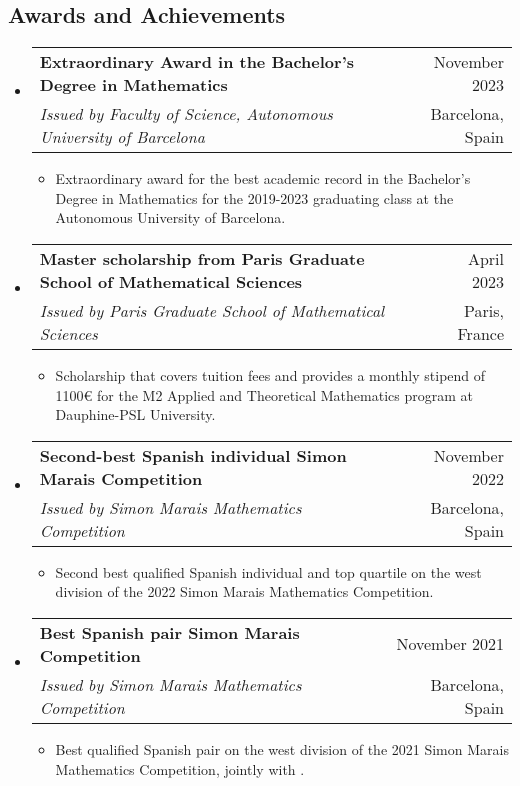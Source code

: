 \documentclass[a4paper,11pt]{article}
\makeatletter
\newcommand{\resumeQuadHeading}[4]{
  \item
  \begin{tabular*}{0.96\textwidth}[t]{l@{\extracolsep{\fill}}r}
    \textbf{#1} & \small #2 \\
    \small#3 & \small #4 \\
  \end{tabular*}
}
\newcommand{\resumeHeadingListStart}{
  \begin{itemize}[leftmargin=0.15in, label={}]
}
\newcommand{\resumeHeadingListEnd}{\end{itemize}}
\makeatother
\begin{document}
\begin{itemize}[leftmargin=3em, itemsep=0.1em, topsep=2pt]
\section{Awards and Achievements}
\resumeHeadingListStart{}
\resumeQuadHeading{Extraordinary Award in the Bachelor's Degree in Mathematics}{November 2023}{\textit{Issued by Faculty of Science, Autonomous University of Barcelona}}{Barcelona, Spain}
\begin{itemize}[leftmargin=3em, itemsep=0.1em, topsep=2pt]
	\item \small Extraordinary award for the best academic record in the Bachelor's Degree in Mathematics for the 2019-2023 graduating class at the Autonomous University of Barcelona.
\end{itemize}
\resumeHeadingListEnd{}

\resumeHeadingListStart{}
\resumeQuadHeading{Master scholarship from Paris Graduate School of Mathematical Sciences}{April 2023}{\textit{Issued by Paris Graduate School of Mathematical Sciences}}{Paris, France}
\begin{itemize}[leftmargin=3em, itemsep=0.1em, topsep=2pt]
	\item \small Scholarship that covers tuition fees and provides a monthly stipend of 1100€ for the M2 Applied and Theoretical Mathematics program at Dauphine-PSL University.
\end{itemize}
\resumeHeadingListEnd{}

\resumeHeadingListStart{}
\resumeQuadHeading{Second-best Spanish individual Simon Marais Competition}{November 2022}{\textit{Issued by Simon Marais Mathematics Competition}}{Barcelona, Spain}
\begin{itemize}[leftmargin=3em, itemsep=0.1em, topsep=2pt]
	\item \small Second best qualified Spanish individual and top quartile on the west division of the 2022 Simon Marais Mathematics Competition.
\end{itemize}
\resumeHeadingListEnd{}

\resumeHeadingListStart{}
\resumeQuadHeading{Best Spanish pair Simon Marais Competition}{November 2021}{\textit{Issued by Simon Marais Mathematics Competition}}{Barcelona, Spain}
\begin{itemize}[leftmargin=3em, itemsep=0.1em, topsep=2pt]
	\item \small Best qualified Spanish pair on the west division of the 2021 Simon Marais Mathematics Competition, jointly with \href{https://github.com/misaelmalqui}{}.
\end{itemize}
\resumeHeadingListEnd{}


\end{itemize}
\end{document}
